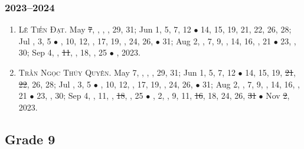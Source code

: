 \documentclass{article}
\begin{document}
\subsubsection{2023--2024}

\begin{enumerate}
	\item \textsc{Lê Tiến Đạt.} May \st{7}, , , , 29, 31; Jun 1, 5, 7, 12 $\bullet$ 14, 15, 19, 21, 22, 26, 28; Jul , 3, 5 $\bullet$ , 10, 12, , 17, 19, , 24, 26,  $\bullet$ 31; Aug 2, , 7, 9, , 14, 16, , 21 $\bullet$ 23, , 30; Sep 4, , \st{11}, , 18, , 25 $\bullet$ , 2023. {\sf[Out]}
	\item \textsc{Trần Ngọc Thúy Quyên.} May 7, , , , 29, 31; Jun 1, 5, 7, 12 $\bullet$ 14, 15, 19, \st{21}, \st{22}, 26, 28; Jul , 3, 5 $\bullet$ , 10, 12, , 17, 19, , 24, 26,  $\bullet$ 31; Aug 2, , 7, 9, , 14, 16, , 21 $\bullet$ 23, , 30; Sep 4, , 11, , \st{18}, , 25 $\bullet$ , 2, , 9, 11, \st{16}, 18, 24, 26, \st{31} $\bullet$ Nov \st{2}, 2023.
\end{enumerate}


\subsection{Grade 9}
\end{document}
